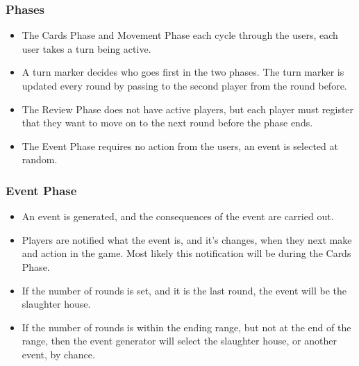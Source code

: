	\subsubsection{Phases}
	  \begin{itemize}
	  	\item \pA The Cards Phase and Movement Phase each cycle through the users, each user takes a turn being active.
	  	\item \pA A turn marker decides who goes first in the two phases. The turn marker is updated every round by passing to the second player from the round before.
	  	\item \pB The Review Phase does not have active players, but each player must register that they want to move on to the next round before the phase ends.
		\item \pA The Event Phase requires no action from the users, an event is selected at random.
	  \end{itemize}
	\subsubsection{Event Phase}
	  \begin{itemize}
	  	\item \pA An event is generated, and the consequences of the event are carried out.
	  	\item \pB Players are notified what the event is, and it's changes, when they next make and action in the game. Most likely this notification will be during the Cards Phase.
	  	\item \pA If the number of rounds is set, and it is the last round, the event will be the slaughter house.
	  	\item \pB If the number of rounds is within the ending range, but not at the end of the range, then the event generator will select the slaughter house, or another event, by chance.
	  \end{itemize}

